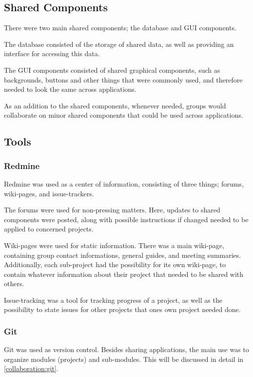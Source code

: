 \subsection{Shared Components}
There were two main shared components; the database and GUI components.

The database consisted of the storage of shared data, as well as providing an interface for accessing this data.

The GUI components consisted of shared graphical components, such as backgrounds, buttons and other things that were commonly used, and therefore needed to look the same across applications.

As an addition to the shared components, whenever needed, groups would collaborate on minor shared components that could be used across applications.

\subsection{Tools}

\subsubsection{Redmine}
Redmine was used as a center of information, consisting of three things; forums, wiki-pages, and issue-trackers.

The forums were used for non-pressing matters.
Here, updates to shared components were posted, along with possible instructions if changed needed to be applied to concerned projects.

Wiki-pages were used for static information.
There was a main wiki-page, containing group contact informations, general guides, and meeting summaries.
Additionally, each sub-project had the possibility for its own wiki-page, to contain whatever information about their project that needed to be shared with others.

Issue-tracking was a tool for tracking progress of a project, as well as the possibility to state issues for other projects that ones own project needed done.

\subsubsection{Git}
Git was used as version control.
Besides sharing applications, the main use was to organize modules (projects) and sub-modules.
This will be discussed in detail in \ref{collaboration:git}.

